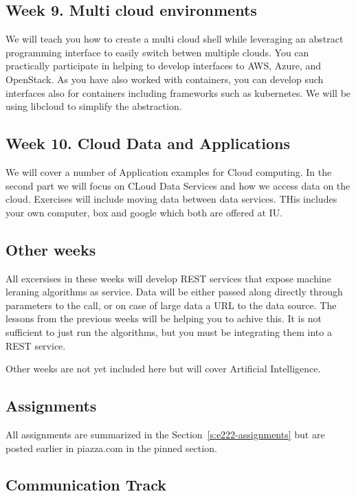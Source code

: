 \subsection{Week 9. Multi cloud environments}

We will teach you how to create a multi cloud shell while leveraging
an abstract programming interface to easily switch betwen multiple
clouds. You can practically participate in helping to develop
interfaces to AWS, Azure, and OpenStack. As you have also worked with
containers, you can develop such interfaces also for containers
including frameworks such as kubernetes. We will be using libcloud to
simplify the abstraction.
	
\subsection{Week 10. Cloud Data and Applications}

We will cover a number of Application examples for Cloud computing. In
the second part we will focus on CLoud Data Services and how we access
data on the cloud. Exercises will include moving data between data
services. THis includes your own computer, box and google which both
are offered at IU.


\subsection{Other weeks}

All excersises in these weeks will develop REST services that expose
machine leraning algorithms as service. Data will be either passed
along directly through parameters to the call, or on case of large
data a URL to the data source. The lessons from the previous weeks
will be helping you to achive this. It is not sufficient to just run
the algorithms, but you must be integrating them into a REST service.

Other weeks are not yet included here but will cover Artificial
Intelligence.

\subsection{Assignments}

All assignments are summarized in the Section~\ref{s:e222-assignments}
but are posted earlier in piazza.com in the pinned section.


\subsection{Communication Track}

